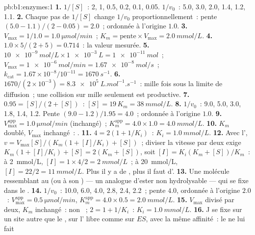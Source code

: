 \begin{solution}{pb:b1:enzymes:1}
\textbf{1.} $1/[S]$~: 2, 1, 0.5, 0.2, 0.1, 0.05. $1/v_0$~: 5.0, 3.0, 2.0,
1.4, 1.2, 1.1.
\textbf{2.} Chaque pas de $1/[S]$ change $1/v_0$ proportionnellement~:
pente $(5.0 - 1.1)/(2 - 0.05) = 2.0$~; ordonnée à l'origine $1.0$.
\textbf{3.} $V_{\max} = 1/1.0 = \qty{1.0}{\micro mol/min}$~; $K_m =
\text{pente}\times V_{\max} = \qty{2.0}{mmol/L}$.
\textbf{4.} $1.0\times 5/(2 + 5) = 0.714$~: la valeur mesurée.
\textbf{5.} $\qty{10e-9}{mol/L}\times\qty{1e-3}{L} = \qty{1e-11}{mol}$~;
$V_{\max} = \qty{1e-6}{mol/min} = \qty{1.67e-8}{mol/s}$~;
$k_{\text{cat}} = 1.67\times 10^{-8}/10^{-11} = \qty{1670}{s^{-1}}$.
\textbf{6.} $1670/(2\times 10^{-3}) = \qty{8.3e5}{L.mol^{-1}.s^{-1}}$~:
mille fois sous la limite de diffusion~; une collision sur mille
seulement est productive.
\textbf{7.} $0.95 = [S]/(2 + [S])$~: $[S] = 19\,K_m = \qty{38}{mmol/L}$.
\textbf{8.} $1/v_0$~: 9.0, 5.0, 3.0, 1.8, 1.4, 1.2. Pente $(9.0 -
1.2)/1.95 = 4.0$~; ordonnée à l'origine $1.0$.
\textbf{9.} $V_{\max}^{\text{app}} = \qty{1.0}{\micro mol/min}$
(inchangé)~; $K_m^{\text{app}} = 4.0\times 1.0 = \qty{4.0}{mmol/L}$.
\textbf{10.} $K_m$ doublé, $V_{\max}$ inchangé~: .
\textbf{11.} $4 = 2(1 + 1/K_i)$~: $K_i = \qty{1.0}{mmol/L}$.
\textbf{12.} Avec l', $v = V_{\max}[S]/(K_m(1 + [I]/K_i) +
[S])$~; diviser la vitesse par deux exige $K_m(1 + [I]/K_i) + [S] = 2(K_m +
[S])$, soit $[I] = K_i(K_m + [S])/K_m$~: à \qty{2}{mmol/L}, $[I] =
1\times 4/2 = \qty{2}{mmol/L}$~; à \qty{20}{mmol/L}, $[I] = 22/2 =
\qty{11}{mmol/L}$. Plus il y a de , plus il faut d'.
\textbf{13.} Une molécule ressemblant au  (ou à son ) --- un analogue d'ester non hydrolysable --- qui se fixe
dans le .
\textbf{14.} $1/v_0$~: 10.0, 6.0, 4.0, 2.8, 2.4, 2.2~; pente $4.0$,
ordonnée à l'origine $2.0$~: $V_{\max}^{\text{app}} = \qty{0.5}{\micro mol/min}$,
$K_m^{\text{app}} = 4.0\times 0.5 = \qty{2.0}{mmol/L}$.
\textbf{15.} $V_{\max}$ divisé par deux, $K_m$ inchangé~: non
~; $2 = 1 + 1/K_i$~: $K_i = \qty{1.0}{mmol/L}$.
\textbf{16.} J se fixe sur un site autre que le , sur l'
libre comme sur $ES$, avec la même affinité~: le  ne lui fait

\end{solution}
